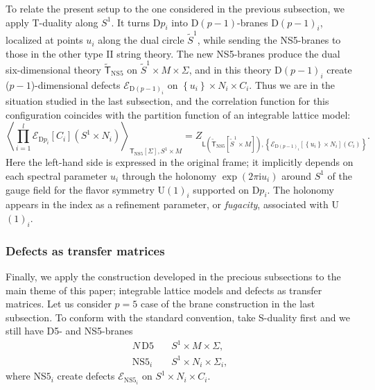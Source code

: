 To relate the present setup to the one considered in the previous
subsection, we apply T-duality along $S^{1}$. It turns D$p_{i}$
into D$\left(p-1\right)$-branes D$\left(p-1\right)_{i}$, localized
at points $u_{i}$ along the dual circle $\tilde{S}^{1}$, while sending
the NS5-branes to those in the other type II string theory. The new
NS5-branes produce the dual six-dimensional theory $\tilde{\mathsf{T}}_{\mathrm{NS5}}$
on $\tilde{S}^{1}\times M\times\Sigma$, and in this theory D$\left(p-1\right)_{i}$
create ($p-1$)-dimensional defects $\mathcal{E}_{\mathrm{D}\left(p-1\right)_{i}}$
on $\left\{ u_{i}\right\} \times N_{i}\times C_{i}$. Thus we are
in the situation studied in the last subsection, and the correlation
function for this configuration coincides with the partition function
of an integrable lattice model: 
\begin{equation}
  \left\langle \prod_{i=1}^{l}\mathcal{E}_{\mathrm{D}p_{i}}\left[C_{i}\right]\left(S^{1}\times N_{i}\right)\right\rangle_{\mathsf{T}_{\mathrm{NS5}}\left[\Sigma\right],S^{1}\times M}
  =Z_{\mathsf{L}\left(\tilde{\mathsf{T}}_{\mathrm{NS5}}\left[\tilde{S}^{1}\times M\right]\right),\left\{ \mathcal{E}_{\mathrm{D}\left(p-1\right)_{i}}\left[\left\{ u_{i}\right\} \times N_{i}\right]\left(C_{i}\right)\right\} }.
\end{equation}
 Here the left-hand side is expressed in the original frame; it implicitly
depends on each spectral parameter $u_{i}$ through the holonomy $\exp\left(2\pi\mathrm{i}u_{i}\right)$
around $S^{1}$ of the gauge field for the flavor symmetry U$(1)_{i}$
supported on D$p_{i}$. The holonomy appears in the index as a refinement
parameter, or \emph{fugacity}, associated with U$(1)_{i}$. 





\subsubsection{Defects as transfer matrices}

Finally, we apply the construction developed in the precious subsections
to the main theme of this paper; integrable lattice models and defects
as transfer matrices. Let us consider $p=5$ case of the brane construction
in the last subsection. To conform with the standard convention, take
S-duality first and we still have D5- and NS5-branes 
\begin{align*}
  N  \,  \mathrm{D5}   &  \quad S^{1}  \times  M  \times  \Sigma,  \\
  \mathrm{NS5}_{i}    &  \quad S^{1}  \times  N_{i}  \times  \Sigma_{i},
\end{align*}
where NS$5_{i}$ create defects $\mathcal{E}_{\mathrm{NS}5_{i}}$
on $S^{1}\times N_{i}\times C_{i}$. 


